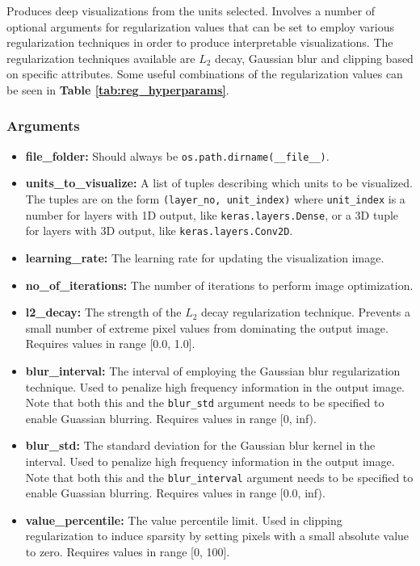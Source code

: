 \noindent Produces deep visualizations from the units selected. Involves a number of optional arguments for regularization values that can be set to employ various regularization techniques in order to produce interpretable visualizations. The regularization techniques available are $L_2$ decay, Gaussian blur and clipping based on specific attributes. Some useful combinations of the regularization values can be seen in \textbf{Table \ref{tab:reg_hyperparams}}.

\subsubsection*{Arguments}

\begin{itemize}
    \item \textbf{file\_folder:} Should always be \texttt{os.path.dirname(\_\_file\_\_)}.
    \item \textbf{units\_to\_visualize:} A list of tuples describing which units to be visualized. The tuples are on the form \texttt{(layer\_no, unit\_index)} where \texttt{unit\_index} is a number for layers with 1D output, like \texttt{keras.layers.Dense}, or a 3D tuple for layers with 3D output, like \texttt{keras.layers.Conv2D}.
    \item \textbf{learning\_rate:} The learning rate for updating the visualization image.
    \item \textbf{no\_of\_iterations:} The number of iterations to perform image optimization.
    \item \textbf{l2\_decay:} The strength of the $L_2$ decay regularization technique. Prevents a small number of extreme pixel values from dominating the output image. Requires values in range [0.0, 1.0].
    \item \textbf{blur\_interval:} The interval of employing the Gaussian blur regularization technique. Used to penalize high frequency information in the output image. Note that both this and the \texttt{blur\_std} argument needs to be specified to enable Guassian blurring. Requires values in range [0, inf).
    \item \textbf{blur\_std:} The standard deviation for the Gaussian blur kernel in the interval. Used to penalize high frequency information in the output image. Note that both this and the \texttt{blur\_interval} argument needs to be specified to enable Guassian blurring. Requires values in range [0.0, inf).
    \item \textbf{value\_percentile:} The value percentile limit. Used in clipping regularization to induce sparsity by setting pixels with a small absolute value to zero. Requires values in range [0, 100].

\end{itemize}
